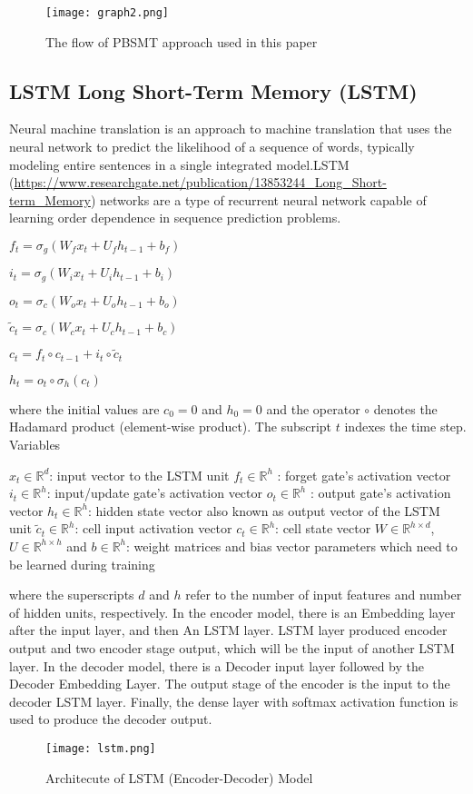\documentclass[conference]{IEEEtran}
\begin{document}
\begin{figure}
  \texttt{[image: graph2.png]}
  \caption{The flow of PBSMT approach used in this paper }
  \label{fig:graph2}
\end{figure}


\subsection{LSTM Long Short-Term Memory (LSTM)}
Neural machine translation is an approach to machine translation that uses the neural network to predict the likelihood of a sequence of words, typically modeling entire sentences in a single integrated model.LSTM (\href{https://www.researchgate.net/publication/13853244_Long_Short-term_Memory}{https://www.researchgate.net/publication/13853244_Long_Short-term_Memory}) networks are a type of recurrent neural network capable of learning order dependence in sequence prediction problems. 


$f_t = \sigma_g(W_fx_t+U_fh_{t-1}+b_f)$

$i_t = \sigma_g(W_ix_t+U_ih_{t-1}+b_i)$

$o_t = \sigma_c(W_ox_t+U_oh_{t-1}+b_o)$

$\tilde{c}_t = \sigma_c(W_cx_t+U_ch_{t-1}+b_c)$

$c_t=f_t \circ c_{t-1}+i_t \circ \tilde{c}_t$

$h_t = o_t \circ \sigma_h(c_t)$

where the initial values are $c_0 = 0$ and $h_0= 0$ and the operator $\circ$ denotes the Hadamard product (element-wise product). The subscript $t$ indexes the time step.
Variables

   $x_{t}\in \mathbb {R} ^{d}$: input vector to the LSTM unit
    $f_{t}\in \mathbb {R} ^{h}$ : forget gate's activation vector
    $i_{t}\in \mathbb {R} ^{h}$: input/update gate's activation vector
   $o_{t}\in \mathbb {R} ^{h}$ : output gate's activation vector
    $h_{t}\in \mathbb {R} ^{h}$: hidden state vector also known as output vector of the LSTM unit
    $\tilde {c}_{t}\in \mathbb {R} ^{h}$: cell input activation vector
  $c_{t}\in \mathbb {R} ^{h}$: cell state vector
    $W\in \mathbb {R} ^{h\times d}$,$U\in \mathbb {R} ^{h\times h}$ and $b\in \mathbb {R} ^{h}$: weight matrices and bias vector parameters which need to be learned during training

where the superscripts $d$ and $h$ refer to the number of input features and number of hidden units, respectively.
In the encoder model, there is an Embedding layer after the input layer, and then An LSTM layer. LSTM layer produced encoder output and two encoder stage output, which will be the input of another LSTM layer. 
In the decoder model, there is a Decoder input layer followed by the Decoder Embedding Layer. The output stage of the encoder is the input to the decoder LSTM layer. Finally, the dense layer with softmax activation function is used to produce the decoder output.
\begin{figure}
  \texttt{[image: lstm.png]}
  \caption{Architecute of LSTM (Encoder-Decoder) Model}
  \label{fig:lstm}
\end{figure}
\end{document}
